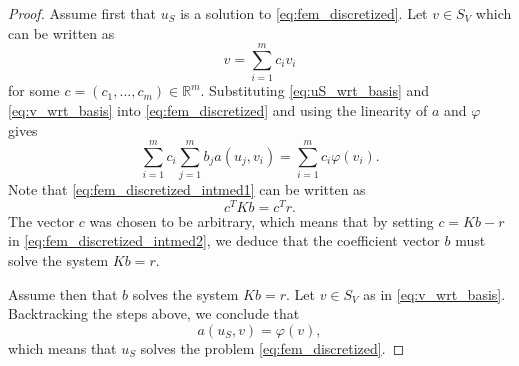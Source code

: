 \documentclass[english, 12pt, a4paper, sci, utf8, a-2b, online]{aaltothesis}
\theoremstyle{definition}
\theoremstyle{plain}
\numberwithin{equation}{section}
\begin{document}
\begin{proof}
    Assume first that $u_S$ is a solution to \eqref{eq:fem_discretized}.
    Let $v \in S_V$ which can be written as
    \begin{equation}
        \label{eq:v_wrt_basis}
        v = \sum_{i=1}^{m} c_i v_i
    \end{equation}
    for some $c = (c_1,\dotsc,c_m) \in \mathbb{R}^m$.
    Substituting \eqref{eq:uS_wrt_basis} and \eqref{eq:v_wrt_basis} into
    \eqref{eq:fem_discretized} and using the linearity of $a$ and $\varphi$
    gives
    \begin{equation}
        \label{eq:fem_discretized_intmed1}
        \sum_{i=1}^{m} c_i \sum_{j=1}^{m} b_j a(u_j,v_i)
        = \sum_{i=1}^{m} c_i \varphi(v_i).
    \end{equation}
    Note that \eqref{eq:fem_discretized_intmed1} can be written as
    \begin{equation}
        \label{eq:fem_discretized_intmed2}
        c^T K b = c^T r.
    \end{equation}
    The vector $c$ was chosen to be arbitrary, which means that by setting
    $c = Kb - r$ in \eqref{eq:fem_discretized_intmed2},
    we deduce that the coefficient vector $b$ must solve the system $Kb = r$.

    Assume then that $b$ solves the system $Kb = r$.
    Let $v \in S_V$ as in \eqref{eq:v_wrt_basis}.
    Backtracking the steps above, we conclude that
    \begin{equation*}
        a(u_S,v) = \varphi(v),
    \end{equation*}
    which means that $u_S$ solves the problem \eqref{eq:fem_discretized}.
\end{proof}
\end{document}
